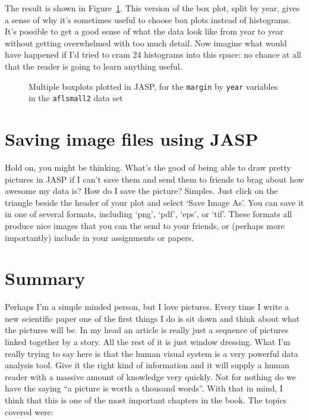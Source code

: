 The result is shown in Figure~\ref{fig:boxplot3}. This version of the box plot, split by year, gives a sense of why it's sometimes useful to choose box plots instead of histograms. It's possible to get a good sense of what the data look like from year to year without getting overwhelmed with too much detail. Now imagine what would have happened if I'd tried to cram 24 histograms into this space: no chance at all that the reader is going to learn anything useful.

\begin{figure}[!!htb]
\begin{center}
\caption{Multiple boxplots plotted in JASP, for the \texttt{margin} by \texttt{year} variables in the \texttt{aflsmall2} data set}
\label{fig:boxplot3}
\HR
\end{center}
\end{figure}


\section{Saving image files using JASP~\label{sec:saveimage}}

Hold on, you might be thinking. What's the good of being able to draw pretty pictures in JASP if I can't save them and send them to friends to brag about how awesome my data is? How do I save the picture? Simples. Just click on the triangle beside the header of your plot and select `Save Image As'.  You can save it in one of several formats, including `png', `pdf', `eps', or `tif'.  These formats all produce nice images that you can the send to your friends, or (perhaps more importantly) include in your assignments or papers.


\section{Summary}

Perhaps I'm a simple minded person, but I love pictures. Every time I write a new scientific paper one of the first things I do is sit down and think about what the pictures will be. In my head an article is really just a sequence of pictures linked together by a story. All the rest of it is just window dressing. What I'm really trying to say here is that the human visual system is a very powerful data analysis tool. Give it the right kind of information and it will supply a human reader with a massive amount of knowledge very quickly. Not for nothing do we have the saying ``a picture is worth a thousand words''. With that in mind, I think that this is one of the most important chapters in the book. The topics covered were:

